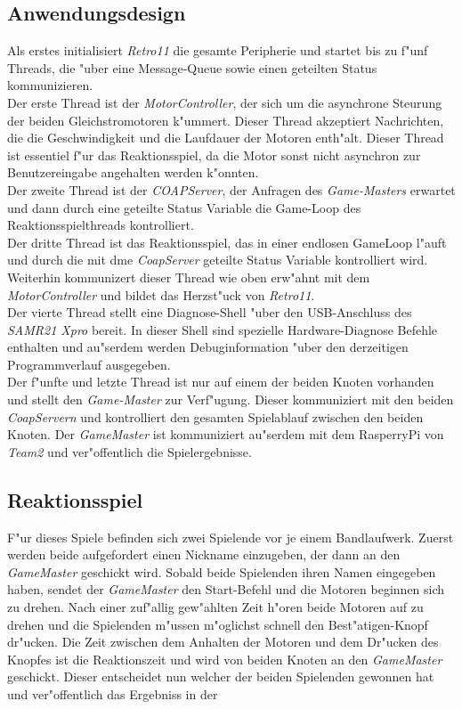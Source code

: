 \documentclass[a4paper]{article}
\begin{document}
  \subsection{Anwendungsdesign}
    \label{sec:retro11_design}
    Als erstes initialisiert \textit{Retro11} die gesamte Peripherie und
    startet bis zu f"unf Threads, die "uber eine Message-Queue sowie einen
    geteilten Status kommunizieren.\\ Der erste Thread ist der
    \textit{MotorController}, der sich um die asynchrone Steurung der beiden
    Gleichstromotoren k"ummert. Dieser Thread akzeptiert Nachrichten, die die
    Geschwindigkeit und die Laufdauer der Motoren enth"alt. Dieser Thread ist
    essentiel f"ur das Reaktionsspiel, da die Motor sonst nicht asynchron zur
    Benutzereingabe angehalten werden k"onnten.\\ Der zweite Thread ist der
    \textit{COAPServer}, der Anfragen des \textit{Game-Masters} erwartet und
    dann durch eine geteilte Status Variable die Game-Loop des
    Reaktionsspielthreads kontrolliert.\\ Der dritte Thread ist das
    Reaktionsspiel, das in einer endlosen GameLoop l"auft und durch die mit dme
    \textit{CoapServer} geteilte Status Variable kontrolliert wird. Weiterhin
    kommunizert dieser Thread wie oben erw"ahnt mit dem
    \textit{MotorController} und bildet das Herzst"uck von \textit{Retro11}.\\
    Der vierte Thread stellt eine Diagnose-Shell "uber den USB-Anschluss des
    \textit{SAMR21 Xpro} bereit. In dieser Shell sind spezielle
    Hardware-Diagnose Befehle enthalten und au"serdem werden Debuginformation
    "uber den derzeitigen Programmverlauf ausgegeben.\\ Der f"unfte und letzte
    Thread ist nur auf einem der beiden Knoten vorhanden und stellt den
    \textit{Game-Master} zur Verf"ugung. Dieser kommuniziert mit den beiden
    \textit{CoapServern} und kontrolliert den gesamten Spielablauf zwischen den
    beiden Knoten. Der \textit{GameMaster} ist kommuniziert au"serdem mit dem
    RasperryPi von \textit{Team2} und ver"offentlich die Spielergebnisse.

  \subsection{Reaktionsspiel}
    \label{sec:retro11_game}
    F"ur dieses Spiele befinden sich zwei Spielende vor je einem Bandlaufwerk.
    Zuerst werden beide aufgefordert einen Nickname einzugeben, der dann an den
    \textit{GameMaster} geschickt wird. Sobald beide Spielenden ihren Namen
    eingegeben haben, sendet der \textit{GameMaster} den Start-Befehl und die
    Motoren beginnen sich zu drehen. Nach einer zuf"allig gew"ahlten Zeit
    h"oren beide Motoren auf zu drehen und die Spielenden m"ussen m"oglichst
    schnell den Best"atigen-Knopf dr"ucken. Die Zeit zwischen dem Anhalten der
    Motoren und dem Dr"ucken des Knopfes ist die Reaktionszeit und wird von
    beiden Knoten an den \textit{GameMaster} geschickt. Dieser entscheidet nun
    welcher der beiden Spielenden gewonnen hat und ver"offentlich das Ergebniss
    in der
\end{document}
